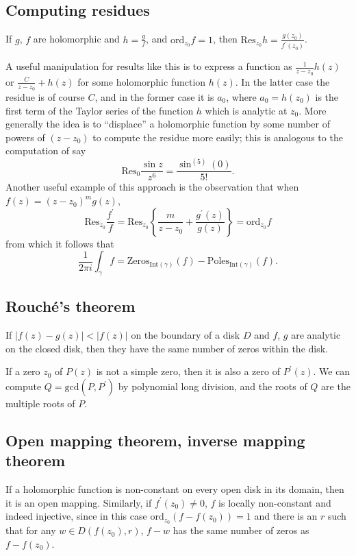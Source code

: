 \documentclass{article}
\newcommand{\ord}{\mathrm{ord}}
\newcommand{\Res}{\mathrm{Res}}
\begin{document}
\subsection{Computing residues}

If $g$, $f$ are holomorphic and
$h = \frac{g}{f}$, and $\ord_{z_0} f = 1$, then
$\Res_{z_0} h = \frac{g(z_0)}{f^\prime(z_0)}$.

A useful manipulation for results like this is to express
a function as $\frac{1}{z - z_0} h(z)$ or
$\frac{C}{z - z_0} + h(z)$ for some holomorphic function
$h(z)$. In the latter case the residue is of course $C$, and in the
former case it is $a_0$, where $a_0 = h(z_0)$ is the first term of the
Taylor series of the function $h$ which is analytic at $z_0$. More
generally the idea is to ``displace'' a holomorphic function by some
number of powers of $(z - z_0)$ to compute the residue more easily;
this is analogous to the computation of say
$$
  \Res_0 \frac{\sin z}{z^6}
= \frac{\sin^{(5)}(0)}{5!}.
$$
Another useful example of this approach is the observation that when
$f(z) = (z - z_0)^m g(z)$,
$$
  \Res_{z_0} \frac{f^\prime}{f}
= \Res_{z_0}
  \left\{
    \frac{m}{z - z_0} + \frac{g^\prime(z)}{g(z)}
  \right\}
= \ord_{z_0} f
$$
from which it follows that
$$
  \frac{1}{2 \pi i}
  \int_\gamma f
= \mathrm{Zeros}_{\mathrm{Int}(\gamma)}(f)
- \mathrm{Poles}_{\mathrm{Int}(\gamma)}(f).
$$

\subsection{Rouch\'e's theorem}
If $|f(z) - g(z)| < |f(z)|$ on the boundary of a disk
$D$ and $f$, $g$ are analytic on the closed disk, then they have the
same number of zeros within the disk.

If a zero $z_0$ of $P(z)$ is not a simple zero, then it is also a zero
of $P^\prime(z)$. We can compute $Q = \mathrm{gcd}(P, P^\prime)$ by
polynomial long division, and the roots of $Q$ are the multiple roots
of $P$.

\subsection{Open mapping theorem, inverse mapping theorem}
If a holomorphic function is non-constant on every open disk in its
domain, then it is an open mapping. Similarly, if $f^\prime(z_0) \neq
0$, $f$ is locally non-constant and indeed injective, since in this
case $\ord_{z_0} (f - f(z_0)) = 1$ and there is an
$r$ such that for any $w \in D(f(z_0), r)$, $f - w$ has the same
number of zeros as $f - f(z_0)$.
\end{document}
